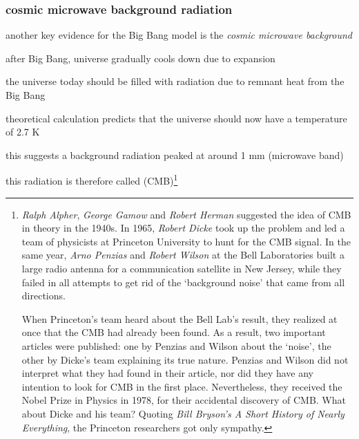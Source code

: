 


\subsubsection*{cosmic microwave background radiation}

another key evidence for the Big Bang model is the \emph{cosmic microwave background}

after Big Bang, universe gradually cools down due to expansion

the universe today should be filled with radiation due to remnant heat from the Big Bang

theoretical calculation predicts that the universe should now have a temperature of 2.7 K

this suggests a background radiation peaked at around 1 mm (microwave band)

this radiation is therefore called  (CMB)\footnote{\emph{Ralph Alpher}, \emph{George Gamow} and \emph{Robert Herman} suggested the idea of CMB in theory in the 1940s. In 1965, \emph{Robert Dicke} took up the problem and led a team of physicists at Princeton University to hunt for the CMB signal. In the same year, \emph{Arno Penzias} and \emph{Robert Wilson} at the Bell Laboratories built a large radio antenna for a communication satellite in New Jersey, while they failed in all attempts to get rid of the `background noise' that came from all directions.

When Princeton's team heard about the Bell Lab's result, they realized at once that the CMB had already been found. As a result, two important articles were published: one by Penzias and Wilson about the `noise', the other by Dicke's team explaining its true nature. Penzias and Wilson did not interpret what they had found in their article, nor did they have any intention to look for CMB in the first place. Nevertheless, they received the Nobel Prize in Physics in 1978, for their accidental discovery of CMB. What about Dicke and his team? Quoting \emph{Bill Bryson's A Short History of Nearly Everything}, the Princeton researchers got only sympathy.}

